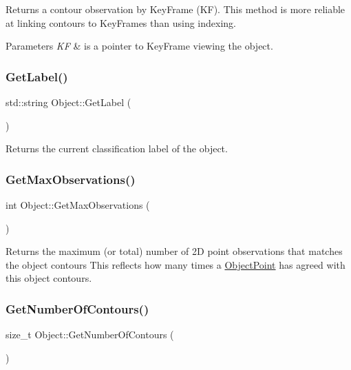 Returns a contour observation by Key\+Frame (KF). This method is more reliable at linking contours to Key\+Frames than using indexing. 
\begin{DoxyParams}{Parameters}
{\em KF} & is a pointer to Key\+Frame viewing the object. \\
\hline
\end{DoxyParams}
\mbox{\label{classObject_ab60f1df2e7bd47cdfb77a529d5ad6c69}} 
\subsubsection{\texorpdfstring{Get\+Label()}{GetLabel()}}
{\footnotesize\ttfamily std\+::string Object\+::\+Get\+Label (\begin{DoxyParamCaption}{ }\end{DoxyParamCaption})}

Returns the current classification label of the object. \mbox{\label{classObject_a9fbecce492d60540c9d3fa2f81773552}} 
\subsubsection{\texorpdfstring{Get\+Max\+Observations()}{GetMaxObservations()}}
{\footnotesize\ttfamily int Object\+::\+Get\+Max\+Observations (\begin{DoxyParamCaption}{ }\end{DoxyParamCaption})}

Returns the maximum (or total) number of 2D point observations that matches the object contours This reflects how many times a \hyperlink{classObjectPoint}{Object\+Point} has agreed with this object contours. \mbox{\label{classObject_a211d9a8ea1cfbc9a3bc766b76e5d41be}} 
\subsubsection{\texorpdfstring{Get\+Number\+Of\+Contours()}{GetNumberOfContours()}}
{\footnotesize\ttfamily size\+\_\+t Object\+::\+Get\+Number\+Of\+Contours (\begin{DoxyParamCaption}{ }\end{DoxyParamCaption})}


